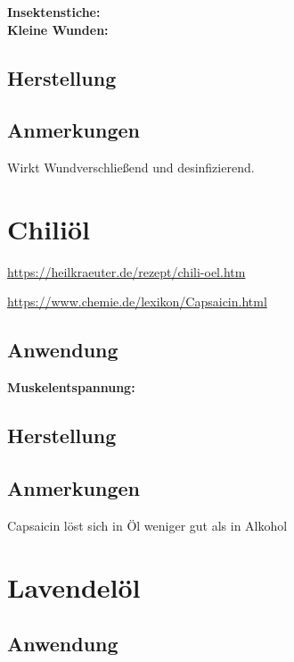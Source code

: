 \textbf{Insektenstiche:} \\ 

\textbf{Kleine Wunden:} \\


\subsection{Herstellung}



\subsection{Anmerkungen}

Wirkt Wundverschließend und desinfizierend.








\section{Chiliöl}


\url{https://heilkraeuter.de/rezept/chili-oel.htm}

\url{https://www.chemie.de/lexikon/Capsaicin.html}

\subsection{Anwendung}

\textbf{Muskelentspannung:}

\subsection{Herstellung}



\subsection{Anmerkungen}

Capsaicin löst sich in Öl weniger gut als in Alkohol







\section{Lavendelöl}

\subsection{Anwendung}

